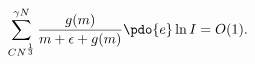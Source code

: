 \begin{equation}
\label{Eq_A42}
\sum^{\gamma N}_{CN^{\frac{1}{3}}}
  \frac{g(m)}{m + \epsilon + g(m)} \pdo{e} \ln I = O(1).
\end{equation}

